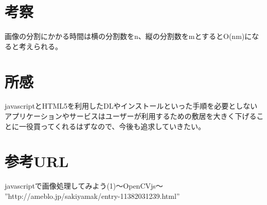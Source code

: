 \documentclass[a4j]{jsarticle}
\begin{document}
\section{考察}
画像の分割にかかる時間は横の分割数をn、縦の分割数をmとするとO(nm)になると考えられる。

\section{所感}
javascriptとHTML5を利用したDLやインストールといった手順を必要としないアプリケーションやサービスはユーザーが利用するための敷居を大きく下げることに一役買ってくれるはずなので、今後も追求していきたい。

\section{参考URL}
\noindent
javascriptで画像処理してみよう(1)〜OpenCVjs〜\\
\noindent
”http://ameblo.jp/sakiyamak/entry-11382031239.html”
\end{document}
